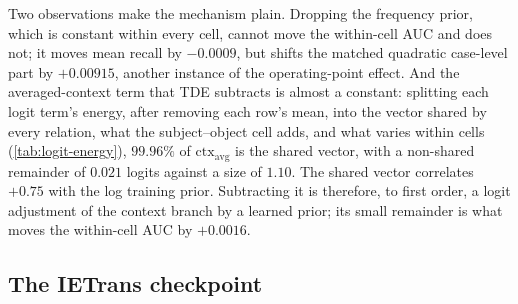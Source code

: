 \begin{table}[h]
\centering\footnotesize
\caption{TDE's change from the baseline, step by step (graph-constrained $mR@50$ above;
no-graph-constraint $mR@50$ and the matched quadratic-score case-level part below). Each
column sums over the steps to TDE's row in \cref{tab:recall-split,tab:proper-configs}.}
\label{tab:tde-path}

\end{table}

Two observations make the mechanism plain. Dropping the frequency prior, which is constant
within every cell, cannot move the within-cell AUC and does not; it moves mean recall by
$-0.0009$, but shifts the matched quadratic case-level part by $+0.00915$, another instance
of the operating-point effect. And the averaged-context term that TDE subtracts is almost a
constant: splitting each logit term's energy, after removing each row's mean, into the
vector shared by every relation, what the subject--object cell adds, and what varies within
cells (\cref{tab:logit-energy}), $99.96\%$ of $\mathrm{ctx}_{\mathrm{avg}}$ is the shared
vector, with a non-shared remainder of $0.021$ logits against a size of $1.10$. The shared
vector correlates $+0.75$ with the log training prior. Subtracting it is therefore, to first
order, a logit adjustment of the context branch by a learned prior; its small remainder is
what moves the within-cell AUC by $+0.0016$.

\begin{table}[h]
\centering\footnotesize
\caption{Energy of each logit term across the $183{,}639$ scored relations: shared by all
relations (global), set by the subject--object cell (between), varying within cells
(within); root-mean-square size of the term and of its non-global part; correlation of the
global vector with the log training prior $\log\pi$. The frequency term's within-cell
share is zero up to float32 rounding.}
\label{tab:logit-energy}

\end{table}

\subsection{The IETrans checkpoint}\label{app:ietrans}

